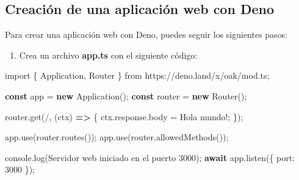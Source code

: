 \documentclass[
  a4paper,
  DIV=11,
  numbers=noendperiod,
  onepage,
  openany]{scrreprt}
\newenvironment{Shaded}{\begin{snugshade}}{\end{snugshade}}
\newcommand{\AttributeTok}[1]{\textcolor[rgb]{0.40,0.45,0.13}{#1}}
\newcommand{\BuiltInTok}[1]{\textcolor[rgb]{0.00,0.23,0.31}{#1}}
\newcommand{\ControlFlowTok}[1]{\textcolor[rgb]{0.00,0.23,0.31}{\textbf{#1}}}
\newcommand{\DecValTok}[1]{\textcolor[rgb]{0.68,0.00,0.00}{#1}}
\newcommand{\FunctionTok}[1]{\textcolor[rgb]{0.28,0.35,0.67}{#1}}
\newcommand{\ImportTok}[1]{\textcolor[rgb]{0.00,0.46,0.62}{#1}}
\newcommand{\KeywordTok}[1]{\textcolor[rgb]{0.00,0.23,0.31}{\textbf{#1}}}
\newcommand{\NormalTok}[1]{\textcolor[rgb]{0.00,0.23,0.31}{#1}}
\newcommand{\OperatorTok}[1]{\textcolor[rgb]{0.37,0.37,0.37}{#1}}
\newcommand{\StringTok}[1]{\textcolor[rgb]{0.13,0.47,0.30}{#1}}
\providecommand{\tightlist}{%
  \setlength{\itemsep}{0pt}\setlength{\parskip}{0pt}}\usepackage{longtable,booktabs,array}
\begin{document}
\begin{tcolorbox}
\section{Creación de una aplicación web con
Deno}\label{creaciuxf3n-de-una-aplicaciuxf3n-web-con-deno}

Para crear una aplicación web con Deno, puedes seguir los siguientes
pasos:

\begin{enumerate}
\def\labelenumi{\arabic{enumi}.}
\tightlist
\item
  Crea un archivo \textbf{app.ts} con el siguiente código:
\end{enumerate}

\begin{Shaded}
\begin{Highlighting}[]
\ImportTok{import}\NormalTok{ \{ Application}\OperatorTok{,}\NormalTok{ Router \} }\ImportTok{from} \StringTok{\textquotesingle{}https://deno.land/x/oak/mod.ts\textquotesingle{}}\OperatorTok{;}

\KeywordTok{const}\NormalTok{ app }\OperatorTok{=} \KeywordTok{new} \FunctionTok{Application}\NormalTok{()}\OperatorTok{;}
\KeywordTok{const}\NormalTok{ router }\OperatorTok{=} \KeywordTok{new} \FunctionTok{Router}\NormalTok{()}\OperatorTok{;}

\NormalTok{router}\OperatorTok{.}\FunctionTok{get}\NormalTok{(}\StringTok{\textquotesingle{}/\textquotesingle{}}\OperatorTok{,}\NormalTok{ (ctx) }\KeywordTok{=\textgreater{}}\NormalTok{ \{}
\NormalTok{  ctx}\OperatorTok{.}\AttributeTok{response}\OperatorTok{.}\AttributeTok{body} \OperatorTok{=} \StringTok{\textquotesingle{}Hola mundo!\textquotesingle{}}\OperatorTok{;}
\NormalTok{\})}\OperatorTok{;}

\NormalTok{app}\OperatorTok{.}\FunctionTok{use}\NormalTok{(router}\OperatorTok{.}\FunctionTok{routes}\NormalTok{())}\OperatorTok{;}
\NormalTok{app}\OperatorTok{.}\FunctionTok{use}\NormalTok{(router}\OperatorTok{.}\FunctionTok{allowedMethods}\NormalTok{())}\OperatorTok{;}

\BuiltInTok{console}\OperatorTok{.}\FunctionTok{log}\NormalTok{(}\StringTok{\textquotesingle{}Servidor web iniciado en el puerto 3000\textquotesingle{}}\NormalTok{)}\OperatorTok{;}
\ControlFlowTok{await}\NormalTok{ app}\OperatorTok{.}\FunctionTok{listen}\NormalTok{(\{ port}\OperatorTok{:} \DecValTok{3000}\NormalTok{ \})}\OperatorTok{;}
\end{Highlighting}
\end{Shaded}


\end{tcolorbox}
\end{document}
